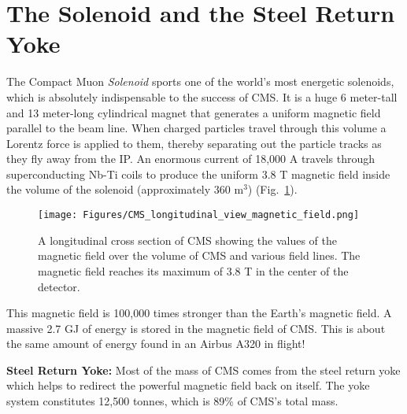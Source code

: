 \section{The Solenoid and the Steel Return Yoke}
\label{sec:solenoid}

The Compact Muon \emph{Solenoid} sports one of the world's most energetic solenoids, which is absolutely indispensable to the success of CMS.
It is a huge 6 meter-tall and 13 meter-long cylindrical magnet that generates a uniform magnetic field parallel to the beam line.
When charged particles travel through this volume a Lorentz force is applied to them,
thereby separating out the particle tracks as they fly away from the IP.
An enormous current of 18,000 A travels through superconducting Nb-Ti coils to produce the uniform 3.8 T magnetic field inside the volume of the solenoid (approximately 360 m$^3$)
 (Fig.~\ref{fig:cms_magnetic_field}).
\begin{figure}[pbth]
\centering
\texttt{[image: Figures/CMS\_longitudinal\_view\_magnetic\_field.png]}
    \caption{
    A longitudinal cross section of CMS showing the values of the magnetic field over the volume of CMS and various field lines. 
    The magnetic field reaches its maximum of 3.8 T in the center of the detector.}
    \label{fig:cms_magnetic_field}
\end{figure}
This magnetic field is 100,000 times stronger than the Earth's magnetic field.
A massive 2.7 GJ of energy is stored in the magnetic field of CMS. 
This is about the same amount of energy found in an Airbus A320 in flight!

{\bf Steel Return Yoke:} 
Most of the mass of CMS comes from the steel return yoke which helps to redirect the powerful magnetic field back on itself. 
The yoke system constitutes 12,500 tonnes, which is 89\% of CMS's total mass.
